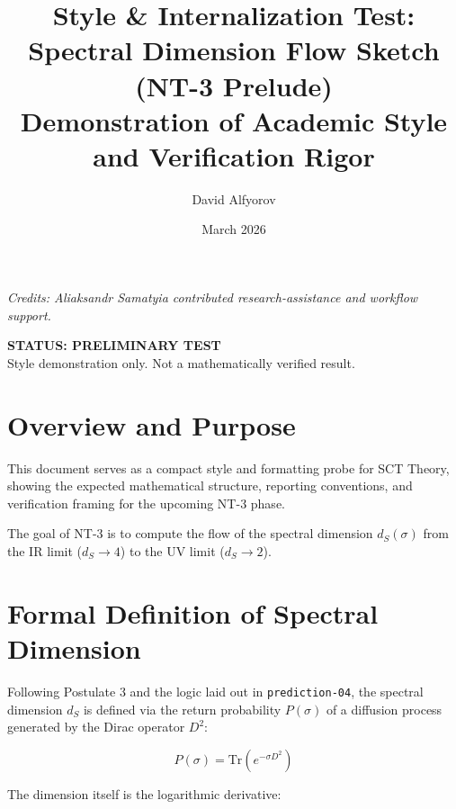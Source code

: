 \documentclass[11pt,a4paper]{article}
\title{%
  \textbf{Style \& Internalization Test:}\\[6pt]
  \Large Spectral Dimension Flow Sketch (NT-3 Prelude)\\[4pt]
  \large Demonstration of Academic Style and Verification Rigor
}
\author{David Alfyorov}
\date{March 2026}
\begin{document}
\maketitle


\begin{center}
\small\textit{Credits: Aliaksandr Samatyia contributed research-assistance and workflow support.}
\end{center}

\begin{center}
  \colorbox{pending!15}{\parbox{0.6\textwidth}{\centering
    \textbf{\color{pending} STATUS: PRELIMINARY TEST}\\[2pt]
    \small Style demonstration only. Not a mathematically verified result.
  }}
\end{center}

\vspace{1em}

\section{Overview and Purpose}

This document serves as a compact style and formatting probe for SCT Theory,
showing the expected mathematical structure, reporting conventions, and
verification framing for the upcoming NT-3 phase.

The goal of NT-3 is to compute the flow of the spectral dimension $d_S(\sigma)$
from the IR limit ($d_S \to 4$) to the UV limit ($d_S \to 2$).

\section{Formal Definition of Spectral Dimension}

Following Postulate 3 and the logic laid out in \texttt{prediction-04},
the spectral dimension $d_S$ is defined via the return probability $P(\sigma)$
of a diffusion process generated by the Dirac operator $D^2$:

\begin{equation}
  P(\sigma) = \mathrm{Tr}\left( e^{-\sigma D^2} \right)
  \label{eq:heat_trace}
\end{equation}

The dimension itself is the logarithmic derivative:
\end{document}
